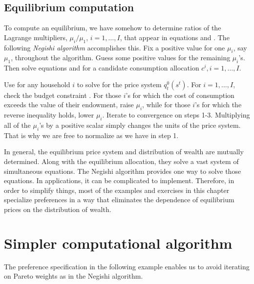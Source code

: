 \subsection{Equilibrium computation}
To compute an equilibrium, we have somehow to determine ratios of
the Lagrange multipliers, $\mu_i / \mu_1$, $i=1, \ldots, I $,
that appear in equations  and .  The following {\it
Negishi algorithm\/} accomplishes this.
\medskip
{}  Fix a positive value for one $\mu_i$, say $\mu_1$,
throughout the algorithm.  Guess  some positive values for the
remaining  $\mu_i$'s. Then solve  equations  and  for
a candidate consumption allocation $c^i, i=1, \ldots, I$.

\medskip
{}  Use  for any household $i$ to solve for the
price system $q_t^0(s^t)$.
\medskip
{}  For $i =1, \ldots, I$, check the budget constraint
.  For those $i$'s for which the cost of consumption
exceeds the value of their endowment, raise $\mu_i$, while for
those $i$'s for which the reverse inequality holds, lower $\mu_i$.
\medskip {} Iterate to convergence on steps 1-3.
\medskip
Multiplying all of the $\mu_i$'s by a positive scalar
simply  changes the units of the price system. That is why we
are free to normalize as we have in step 1.

In general, the equilibrium price system and distribution of wealth are mutually determined. Along with the equilibrium allocation, they solve
a vast system of simultaneous equations.  The Negishi algorithm provides one way to solve those equations.
In applications, it can be complicated to implement.  Therefore, in order to simplify things,
  most of the examples and exercises in this chapter specialize  preferences
in a way that eliminates the dependence of equilibrium prices on the distribution of wealth.







\section{Simpler computational algorithm}
The preference specification in the following example enables us to avoid iterating on Pareto weights as in
the Negishi algorithm.
